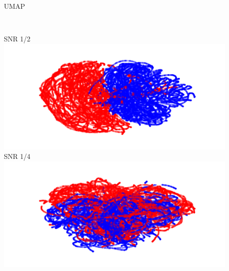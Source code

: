 \documentclass[t, 11pt, xcolor=dvipsnames]{beamer}
\begin{document}
\begin{frame}[fragile]{UMAP}
\begin{center}
\begin{minipage}{0.47\textwidth}
		  \end{minipage}
			~
		  \begin{minipage}{0.47\textwidth}
	          SNR 1/2\\
                  \includegraphics[width=0.9\textwidth]{images/dimredcomps/UMAP_gt_snr1_2.png}\\
		  SNR 1/4\\
                  \includegraphics[width=0.9\textwidth]{images/dimredcomps/UMAP_gt_snr1_4.png}\\
		  \end{minipage}
	\end{center}
\end{frame}
\end{document}
